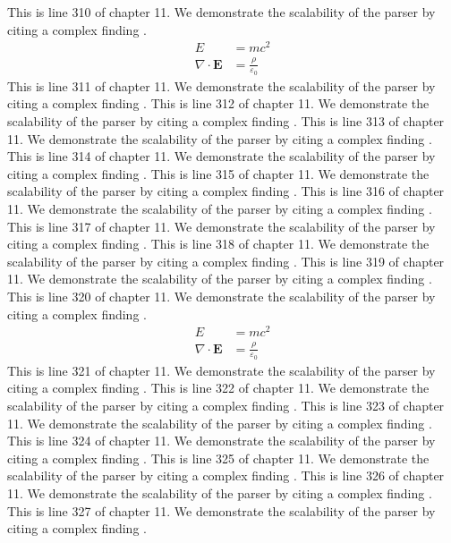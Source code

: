 This is line 310 of chapter 11. We demonstrate the scalability of the parser by citing a complex finding \cite{ref11_310}.
\begin{align*}
  E &= mc^2 \\
  \nabla \cdot \mathbf{E} &= \frac{\rho}{\varepsilon_0}
\end{align*}
This is line 311 of chapter 11. We demonstrate the scalability of the parser by citing a complex finding \cite{ref11_311}.
This is line 312 of chapter 11. We demonstrate the scalability of the parser by citing a complex finding \cite{ref11_312}.
This is line 313 of chapter 11. We demonstrate the scalability of the parser by citing a complex finding \cite{ref11_313}.
This is line 314 of chapter 11. We demonstrate the scalability of the parser by citing a complex finding \cite{ref11_314}.
This is line 315 of chapter 11. We demonstrate the scalability of the parser by citing a complex finding \cite{ref11_315}.
This is line 316 of chapter 11. We demonstrate the scalability of the parser by citing a complex finding \cite{ref11_316}.
This is line 317 of chapter 11. We demonstrate the scalability of the parser by citing a complex finding \cite{ref11_317}.
This is line 318 of chapter 11. We demonstrate the scalability of the parser by citing a complex finding \cite{ref11_318}.
This is line 319 of chapter 11. We demonstrate the scalability of the parser by citing a complex finding \cite{ref11_319}.
This is line 320 of chapter 11. We demonstrate the scalability of the parser by citing a complex finding \cite{ref11_320}.
\begin{align*}
  E &= mc^2 \\
  \nabla \cdot \mathbf{E} &= \frac{\rho}{\varepsilon_0}
\end{align*}
This is line 321 of chapter 11. We demonstrate the scalability of the parser by citing a complex finding \cite{ref11_321}.
This is line 322 of chapter 11. We demonstrate the scalability of the parser by citing a complex finding \cite{ref11_322}.
This is line 323 of chapter 11. We demonstrate the scalability of the parser by citing a complex finding \cite{ref11_323}.
This is line 324 of chapter 11. We demonstrate the scalability of the parser by citing a complex finding \cite{ref11_324}.
This is line 325 of chapter 11. We demonstrate the scalability of the parser by citing a complex finding \cite{ref11_325}.
This is line 326 of chapter 11. We demonstrate the scalability of the parser by citing a complex finding \cite{ref11_326}.
This is line 327 of chapter 11. We demonstrate the scalability of the parser by citing a complex finding \cite{ref11_327}.
